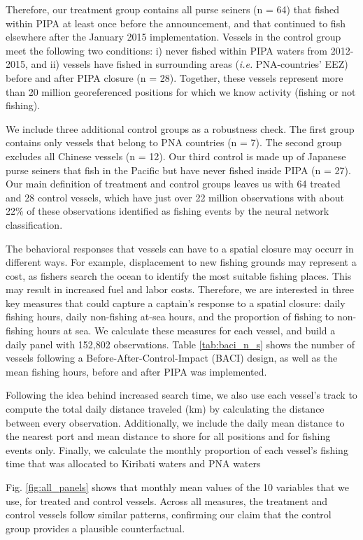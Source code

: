 \documentclass[9pt,twoside,lineno]{pnas-new}
\begin{document}
Therefore, our treatment group contains all purse seiners (n = 64) that
fished within PIPA at least once before the announcement, and that
continued to fish elsewhere after the January 2015 implementation.
Vessels in the control group meet the following two conditions: i)
never fished within PIPA waters from 2012-2015, and ii) vessels have fished in
surrounding areas (\emph{i.e.} PNA-countries' EEZ) before and after PIPA
closure (n = 28). Together, these vessels represent more than 20 million georeferenced positions
for which we know activity (fishing or not fishing).

We include three additional control groups as a
robustness check. The first group contains only vessels that belong to PNA countries (n
= 7). The second group excludes all Chinese vessels (n = 12). Our third control
is made up of Japanese purse seiners that fish in the Pacific but have
never fished inside PIPA (n = 27). Our main definition of treatment and control
groups leaves us with 64 treated and 28 control vessels, which have just over 22 million
observations with about 22\% of these observations identified as fishing events by the neural network classification.

The behavioral responses that vessels can have to a spatial closure may occurr in different ways.
For example, displacement to new fishing grounds may represent a cost, as fishers search the ocean
to identify the most suitable fishing places. This may result in increased fuel and labor costs. Therefore,
we are interested in three key measures that could capture a captain's response to a spatial closure:
daily fishing hours, daily non-fishing at-sea hours, and the proportion of fishing to non-fishing hours at sea.
We calculate these measures for each vessel, and build a daily panel
with 152,802 observations. Table \ref{tab:baci_n_s} shows the number
of vessels following a Before-After-Control-Impact (BACI) design, as well as the mean fishing hours, before
and after PIPA was implemented.

Following the idea behind increased search time, we also use each vessel's track to compute
the total daily distance traveled (km) by calculating the distance between every observation.
Additionally, we include the daily mean distance to the nearest port and mean distance to shore
for all positions and for fishing events only. Finally, we calculate the monthly proportion of each vessel's
fishing time that was allocated to Kiribati waters and PNA waters

Fig. \ref{fig:all_panels} shows that monthly mean values of the 10 variables that we use,
for treated and control vessels.  Across all measures, the treatment and control vessels follow similar patterns,
confirming our claim that the control group provides a plausible
counterfactual.
\end{document}

